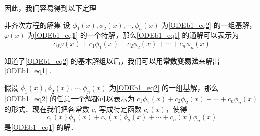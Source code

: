 因此，我们容易得到以下定理
\begin{theorem}{非齐次方程的解集}
设 $\phi_1(x), \phi_2(x), \cdots, \phi_n(x)$ 为\autoref{ODEb1_eq2} 的一组基解，$\varphi(x)$ 为\autoref{ODEb1_eq1} 的一个特解，那么\autoref{ODEb1_eq1} 的通解可以表示为
\begin{equation}
c_0\varphi(x)+c_1\phi_1(x)+c_2\phi_2(x)+\cdots+c_n\phi_n(x)
\end{equation}
\end{theorem}

知道了\autoref{ODEb1_eq2} 的基本解组以后，我们可以用\textbf{常数变易法}来解出\autoref{ODEb1_eq1} .

假设 $\phi_1(x), \phi_2(x), \cdots, \phi_n(x)$ 为\autoref{ODEb1_eq2} 的一组基解，那么\autoref{ODEb1_eq2} 的任意一个解都可以表示为 $c_1\phi_1(x)+c_2\phi_2(x)+\cdots+c_n\phi_n(x)$ 的形式．现在我们把各常数 $c_i$ 写成待定函数 $c_i(x)$，使得
\begin{equation}
c_1(x)\phi_1(x)+c_2(x)\phi_2(x)+\cdots+c_n(x)\phi_n(x)
\end{equation}
是\autoref{ODEb1_eq1} 的解．

